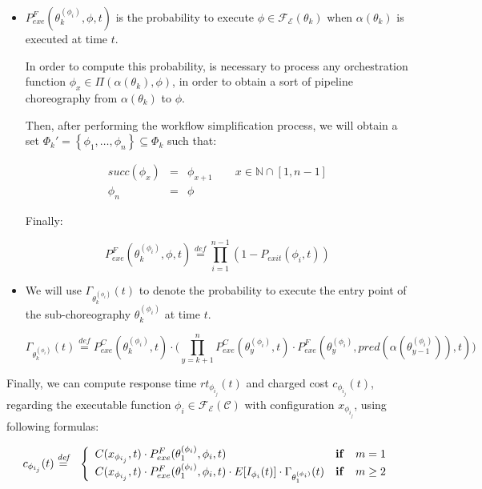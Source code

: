 \documentclass[12pt,a4paper]{report}
\newcommand{\mathDef}{\overset{\textit{def}}{=}}
\newcommand{\N}{\mathbb{N}}
\newcommand{\SetFromOneTo}[1]{\N \cap \left[1,#1\right]}
\begin{document}
\begin{itemize}
	
	\item $P_{exe}^F(\theta^{(\phi_i)}_k, \phi, t)$ is the probability to execute $\phi \in \mathscr{F_E}(\theta_k)$ when $\alpha(\theta_k)$ is executed at time $t$. 
	
	In order to compute this probability, is necessary to process any orchestration function $\phi_x \in \Pi(\alpha(\theta_k),\phi)$, in order to obtain a sort of pipeline choreography from $\alpha(\theta_k)$ to $\phi$.
	
	Then, after performing the workflow simplification process, we will obtain a set $\Phi_k' = \left\{\phi_1, \ldots, \phi_n \right\} \subseteq \Phi_k$ such that:
	
	\begin{eqnarray}
		succ(\phi_x) & = &  \phi_{x+1}  \qquad x \in \SetFromOneTo{n -1} \\ \phi_n & = & \phi
	\end{eqnarray}
	
	Finally:
		
	\begin{equation}
		P_{exe}^F(\theta^{(\phi_i)}_k, \phi, t) \mathDef \prod_{i = 1}^{n-1} (1 - P_{exit}(\phi_i,t))
	\end{equation}
	


\item We will use $\Gamma_{\theta_k^{(\phi_{i})}}(t)$ to denote the probability to execute the entry point of the sub-choreography $\theta_k^{(\phi_{i})}$ at time $t$.

\begin{equation}
	\Gamma_{\theta_k^{(\phi_{i})}}(t) \mathDef P_{exe}^C(\theta^{(\phi_i)}_{k},t) \cdot \Bigg( \prod_{y = k + 1}^{n}  P_{exe}^C(\theta^{(\phi_i)}_{y},t) \cdot P_{exe}^{F}(\theta^{(\phi_i)}_{y}, pred(\alpha(\theta^{(\phi_i)}_{y-1})),t) \Bigg)
\end{equation}

\end{itemize}

Finally, we can compute response time $rt_{\phi_{i_{j}}}(t)$ and charged cost $c_{\phi_{i_{j}}}(t)$, regarding the executable function $\phi_i \in \mathscr{F_E}(\mathcal{C})$ with configuration $x_{\phi_{i_{j}}}$, using following formulas:

\begin{eqnarray}
	c_{\phi_{i_{j}}}(t) & \mathDef & \left\{ 
	\begin{array}{lcl}
		C(x_{\phi_{i_{j}}},t) \cdot P_{exe}^{F}(\theta^{(\phi_i)}_1, \phi_i,t) & \text{\textbf{if}} & m = 1 \nonumber\\ 
		C(x_{\phi_{i_{j}}},t) \cdot P_{exe}^{F}(\theta^{(\phi_i)}_1, \phi_i,t) \cdot E[I_{\phi_i}(t)] \cdot \Gamma_{\theta_1^{(\phi_{i})}}(t) & \text{\textbf{if}} & m \geq 2 \\ 
	\end{array} \right.\label{cost}\\
\end{eqnarray}
\end{document}

